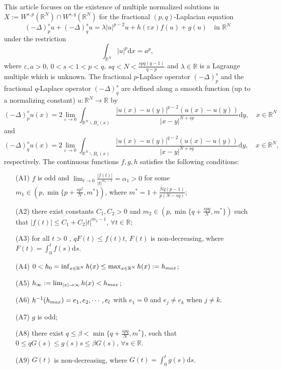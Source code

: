 \documentclass[10pt,a4paper]{amsart}
\numberwithin{equation}{section}
\begin{document}
This article focuses on the existence of multiple normalized solutions in
$X:=W^{s,p}(\mathbb {R}^N)\cap W^{s,q}(\mathbb {R}^N)$ for the
 fractional $(p,q)$-Laplacian equation
\begin{equation}\label{eqn-(1.1)}
(-\Delta)_p^{s} u+(-\Delta)_q^{s} u=\lambda |u|^{p-2}u+h(\varepsilon x)f(u)+g(u)\quad \text{in } \mathbb {R}^N
\end{equation}
under {the restriction}
\begin{equation}\label{eqn-(1.2)}
\int_{\mathbb {R}^{N}}|u|^p \mathrm{d}x=a^p,
\end{equation}
where $\varepsilon,a>0$,  $0<s<1<p<q$, $sq<N<\frac{spq(q-1)}{q-p}$ and
$\lambda \in \mathbb {R}$ is a Lagrange multiple which is unknown. The fractional
$p$-Laplace operator $(-\Delta)_p^{s}$ and the fractional
$q$-Laplace operator $(-\Delta)_q^{s}$
are defined along a smooth function (up to a normalizing constant)
$u:\mathbb{R}^N\to \mathbb{R}$ by
$$
(-\Delta)_p^{s} u(x)=2\lim_{\varepsilon\to 0}\int_{\mathbb{R}^N\backslash B_{\varepsilon}(x)}
\frac{|u(x)-u(y)|^{p-2}(u(x)-u(y))}{|x-y|^{N+sp}}\mathrm{d}y,\quad x\in\mathbb{R}^N
$$
and
$$
(-\Delta)_q^{s} u(x)=2\lim_{\varepsilon\to 0}\int_{\mathbb{R}^N\backslash
B_{\varepsilon}(x)}\frac{|u(x)-u(y)|^{q-2}(u(x)-u(y))}{|x-y|^{N+sq}}\mathrm{d}y,\quad x\in\mathbb{R}^N,$$
respectively. The continuous functions $f,g,h$ satisfies the following conditions:
\begin{itemize}
\item[(A1)]  $f$ is odd and $\lim_{t\to 0}\frac{|f(t)|}{|t|^{m_1-1}}=\alpha_1 >0$ for some
$m_1\in(p,\min\{p+\frac{sp^2}{N},m^{*}\})$, where $m^{*}= 1+\frac{Nq(p-1)}{p(N-sq)}$;

\item[(A2)] there exist constants $C_1, C_2>0$ and $m_2\in(p,\min\{q+\frac{spq}{N},m^{*}\})$
such that $|f(t)|\le C_1+C_2|t|^{m_2-1}$, $\forall t\in \mathbb{R}$;

\item[(A3)] for all $t>0$ , $qF(t)\le f(t)t$, $F(t)$ is non-decreasing, where
$F(t)=\int_0^{t}f(s)\mathrm{d}s$.

\item[(A4)] $0<h_0=\inf_{x\in \mathbb{R}^{N}}h(x)\le \max_{x\in \mathbb{R}^{N}} h(x):=h_{\rm max}$;

\item[(A5)] $h_{\infty}:=\lim_{|x|\to \infty}h(x)<h_{\rm max}$;

\item[(A6)] $h^{-1}(h_{\rm max})={e_1,e_2,\cdots,e_l}$ with $e_1=0$ and $e_j\neq e_k$ when $j\neq k$.

\item[(A7)] $g$ is odd;

\item[(A8)] there exist $q\le\beta<\min\{q+\frac{spq}{N},m^{*}\}$, such that $0\le q G(s)\le g(s)s\le\beta G(s)$, $\forall s\in\mathbb{R}$.

\item[(A9)]  $G(t)$ is non-decreasing, where $G(t)=\int_0^{t}g(s)\mathrm{d}s$.
\end{itemize}
\end{document}

